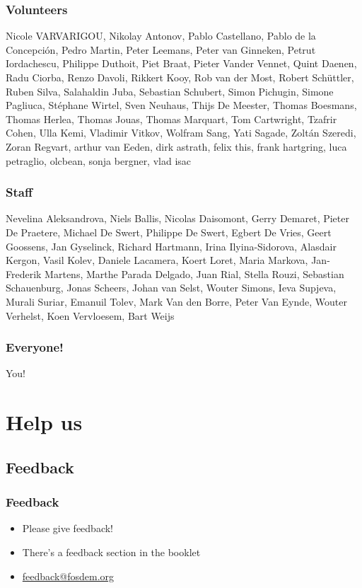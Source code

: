 \documentclass[aspectratio=169]{beamer}
\begin{document}
\begin{frame}
	\frametitle{Volunteers}
	 Nicole VARVARIGOU, Nikolay Antonov, Pablo Castellano, Pablo de la Concepción, Pedro Martin, Peter Leemans, Peter van Ginneken, Petrut Iordachescu, Philippe Duthoit, Piet Braat, Pieter Vander Vennet, Quint Daenen, Radu Ciorba, Renzo Davoli, Rikkert Kooy, Rob van der Most, Robert Schüttler, Ruben Silva, Salahaldin Juba, Sebastian Schubert, Simon Pichugin, Simone Pagliuca, Stéphane Wirtel, Sven Neuhaus, Thijs De Meester, Thomas Boesmans, Thomas Herlea, Thomas Jouas, Thomas Marquart, Tom Cartwright, Tzafrir Cohen, Ulla Kemi, Vladimir Vitkov, Wolfram Sang, Yati Sagade, Zoltán Szeredi, Zoran Regvart, arthur van Eeden, dirk astrath, felix this, frank hartgring, luca petraglio, olcbean, sonja bergner, vlad isac
\end{frame}

\begin{frame}
	\frametitle{Staff}
	\vfill
	Nevelina Aleksandrova, Niels Ballis, Nicolas Daisomont, Gerry Demaret, Pieter De Praetere, Michael De Swert, Philippe De Swert, Egbert De Vries, Geert Goossens, Jan Gyselinck, Richard Hartmann, Irina Ilyina-Sidorova, Alasdair Kergon, Vasil Kolev, Daniele Lacamera, Koert Loret, Maria Markova, Jan-Frederik Martens, Marthe Parada Delgado, Juan Rial, Stella Rouzi, Sebastian Schauenburg, Jonas Scheers, Johan van Selst, Wouter Simons, Ieva Supjeva, Murali Suriar, Emanuil Tolev, Mark Van den Borre, Peter Van Eynde, Wouter Verhelst, Koen Vervloesem, Bart Weijs
	\vfill
\end{frame}

\begin{frame}
	\frametitle{Everyone!}
	\vfill
	\begin{center}
	{\Huge You!}
	\end{center}
	\vfill
\end{frame}


\section{Help us}

\subsection{Feedback}

\begin{frame}
	\frametitle{Feedback}
	\vfill
	\begin{itemize}
		\item Please give feedback!
		\item There's a feedback section in the booklet
		\item \url{feedback@fosdem.org}
	\end{itemize}
	\vfill
\end{frame}
\end{document}
